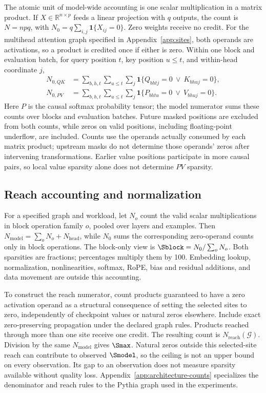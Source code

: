 The atomic unit of model-wide accounting is one scalar multiplication in a
matrix product. If $X\in\mathbb{R}^{n\times p}$ feeds a linear projection with
$q$ outputs, the count is $N=npq$, with $N_0=q\sum_{i,j}\mathbf{1}\{X_{ij}=0\}$.
Zero weights receive no credit. For the multihead attention graph specified in Appendix~\ref{app:sites},
both operands are activations,
so a product is credited once if either is zero. Within one block and
evaluation batch, for query position $t$,
key position $u\leq t$, and within-head coordinate $j$,
\begin{align}
N_{0,QK}&=\sum_{b,h,t}\sum_{u\leq t}\sum_j
\mathbf{1}\{Q_{bhtj}=0\ \lor\ K_{bhuj}=0\},\label{eq:qk-count}\\
N_{0,PV}&=\sum_{b,h,t}\sum_{u\leq t}\sum_j
\mathbf{1}\{P_{bhtu}=0\ \lor\ V_{bhuj}=0\}.\label{eq:pv-count}
\end{align}
Here $P$ is the causal softmax probability tensor; the model numerator sums
these counts over blocks and evaluation batches. Future masked positions
are excluded from both counts, while zeros on valid positions, including
floating-point underflow, are included. Counts use the operands actually consumed by each matrix product; upstream
masks do not determine those operands' zeros after intervening transformations.
Earlier value positions participate
in more causal pairs, so local value sparsity alone does not determine $PV$
sparsity.

\subsection{Reach accounting and normalization}
\label{app:ceiling}

For a specified graph and workload, let $N_o$ count the valid scalar
multiplications in block operation family $o$, pooled over layers and
examples. Then $N_{\mathrm{model}}=\sum_o N_o+N_{\mathrm{head}}$, while $N_0$
sums the corresponding zero-operand counts only in block operations.
The block-only view is $\Sblock=N_0/\sum_o N_o$. Both sparsities are fractions;
percentages multiply them by 100. Embedding lookup, normalization,
nonlinearities, softmax, RoPE, bias and residual additions, and data movement
are outside this accounting.

To construct the reach numerator, count products guaranteed to have a zero
activation operand as a structural consequence of setting the selected sites
to zero, independently of checkpoint values or natural zeros elsewhere.
Include exact zero-preserving propagation under the declared graph rules. Products reached through more
than one site receive one credit. The resulting count is
$N_{\mathrm{reach}}(\mathcal{G})$. Division by the same $N_{\mathrm{model}}$
gives $\Smax$. Natural zeros outside this selected-site reach can contribute
to observed $\Smodel$, so the ceiling is not an upper bound on every
observation. Its gap to an observation does not measure sparsity available
without quality loss. Appendix~\ref{app:architecture-counts} specializes
the denominator and reach rules to the Pythia graph used in the experiments.

